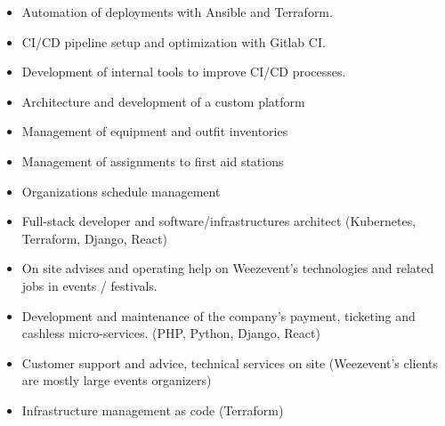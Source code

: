 
\begin{itemize}
    \item Automation of deployments with Ansible and Terraform.
    \item CI/CD pipeline setup and optimization with Gitlab CI.
    \item Development of internal tools to improve CI/CD processes.
\end{itemize}

\divider

\begin{itemize}
    \item Architecture and development of a custom platform
    \item Management of equipment and outfit inventories
    \item Management of assignments to first aid stations
    \item Organizations schedule management
\end{itemize}

\divider

\begin{itemize}
    \item Full-stack developer and software/infrastructures architect (Kubernetes, Terraform, Django, React)
\end{itemize}

\divider

\begin{itemize}
    \item On site advises and operating help on Weezevent's technologies and related jobs in events / festivals.
\end{itemize}

\divider

\begin{itemize}
    \item Development and maintenance of the company's payment, ticketing and cashless micro-services. (PHP, Python, Django, React)
    \item Customer support and advice, technical services on site (Weezevent's clients are mostly large events organizers)
    \item Infrastructure management as code (Terraform)
\end{itemize}

